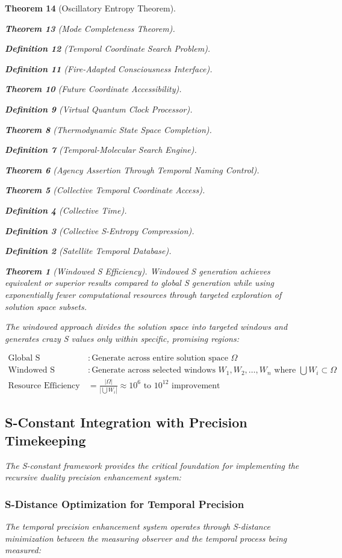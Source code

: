 \documentclass[12pt,a4paper]{article}
\newtheorem{theorem}{Theorem}[section]
\newtheorem{definition}[theorem]{Definition}
\begin{document}
\begin{theorem}[Oscillatory Entropy Theorem]
\begin{theorem}[Mode Completeness Theorem]
\begin{enumerate}
\begin{definition}[Temporal Coordinate Search Problem]
\begin{algorithm}
\begin{definition}[Fire-Adapted Consciousness Interface]
\begin{theorem}[Future Coordinate Accessibility]
\begin{definition}[Virtual Quantum Clock Processor]
\begin{itemize}
\begin{itemize}
\begin{theorem}[Thermodynamic State Space Completion]
\begin{definition}[Temporal-Molecular Search Engine]
\begin{theorem}[Agency Assertion Through Temporal Naming Control]
\begin{remark}
\begin{theorem}[Collective Temporal Coordinate Access]
\begin{definition}[Collective Time]
\begin{definition}[Collective S-Entropy Compression]
\begin{definition}[Satellite Temporal Database]
\begin{algorithm}
\begin{table}[h]
{{\begin{theorem}[Windowed S Efficiency]
Windowed S generation achieves equivalent or superior results compared to global S generation while using exponentially fewer computational resources through targeted exploration of solution space subsets.
\end{theorem}

The windowed approach divides the solution space into targeted windows and generates crazy S values only within specific, promising regions:

\begin{align}
\text{Global S Generation} &: \text{Generate across entire solution space } \Omega \\
\text{Windowed S Generation} &: \text{Generate across selected windows } W_1, W_2, \ldots, W_n \text{ where } \bigcup W_i \subset \Omega \\
\text{Resource Efficiency} &= \frac{|\Omega|}{|\bigcup W_i|} \approx 10^6 \text{ to } 10^{12} \text{ improvement}
\end{align}

\subsection{S-Constant Integration with Precision Timekeeping}

The S-constant framework provides the critical foundation for implementing the recursive duality precision enhancement system:

\subsubsection{S-Distance Optimization for Temporal Precision}

The temporal precision enhancement system operates through S-distance minimization between the measuring observer and the temporal process being measured:

}}
\end{table}
\end{algorithm}
\end{definition}
\end{definition}
\end{definition}
\end{theorem}
\end{remark}
\end{theorem}
\end{definition}
\end{theorem}
\end{itemize}
\end{itemize}
\end{definition}
\end{theorem}
\end{definition}
\end{algorithm}
\end{definition}
\end{enumerate}
\end{theorem}
\end{theorem}
\end{document}
